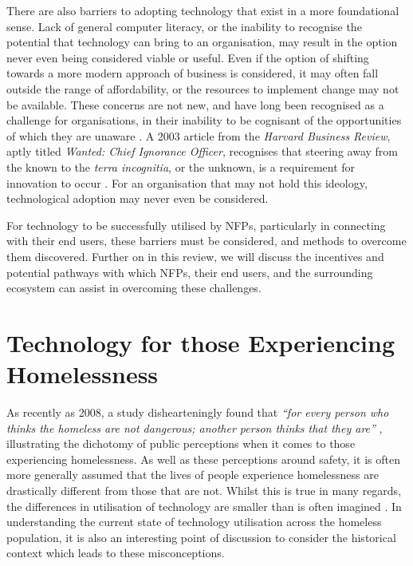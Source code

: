 There are also barriers to adopting technology that exist in a more foundational sense. Lack of general computer literacy, or the inability to recognise the potential that technology can bring to an organisation, may result in the option never even being considered viable or useful. Even if the option of shifting towards a more modern approach of business is considered, it may often fall outside the range of affordability, or the resources to implement change may not be available. These concerns are not new, and have long been recognised as a challenge for organisations, in their inability to be cognisant of the opportunities of which they are unaware \cite{benjamin1983information}. A 2003 article from the \emph{Harvard Business Review}, aptly titled \emph{Wanted: Chief Ignorance Officer}, recognises that steering away from the known to the \emph{terra incognitia}, or the unknown, is a requirement for innovation to occur \cite{gray2003wanted}. For an organisation that may not hold this ideology, technological adoption may never even be considered.

For technology to be successfully utilised by NFPs, particularly in connecting with their end users, these barriers must be considered, and methods to overcome them discovered. Further on in this review, we will discuss the incentives and potential pathways with which NFPs, their end users, and the surrounding ecosystem can assist in overcoming these challenges.

\section{Technology for those Experiencing Homelessness}

As recently as 2008, a study dishearteningly found that \emph{“for every person who thinks the homeless are not dangerous; another person thinks that they are”} \cite[p.~117]{donley2008perception}, illustrating the dichotomy of public perceptions when it comes to those experiencing homelessness. As well as these perceptions around safety, it is often more generally assumed that the lives of people experience homelessness are drastically different from those that are not. Whilst this is true in many regards, the differences in utilisation of technology are smaller than is often imagined \cite{le2008designs} \cite{pollio2013technology} \cite{rhoades2017no}. In understanding the current state of technology utilisation across the homeless population, it is also an interesting point of discussion to consider the historical context which leads to these misconceptions.

